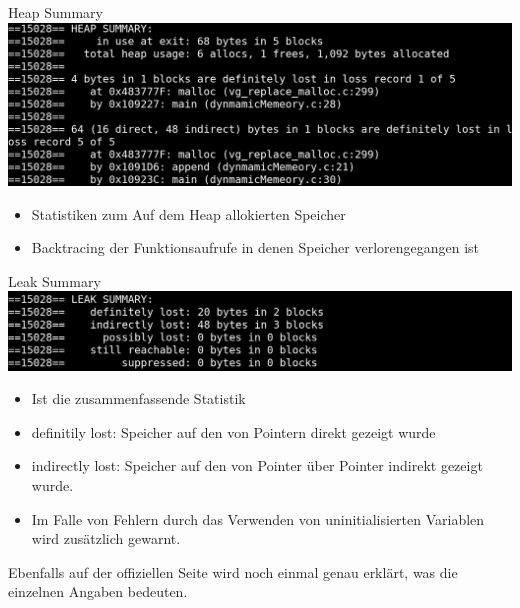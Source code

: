 \begin{frame}[fragile]{Heap Summary}
\includegraphics[width = \linewidth]{../img/heapSummary.png}
\begin{itemize}
 \item Statistiken zum Auf dem Heap allokierten Speicher
 \item Backtracing der Funktionsaufrufe in denen Speicher verlorengegangen ist
\end{itemize}

\end{frame}
\begin{frame}[fragile]{Leak Summary}
\includegraphics[width = \linewidth]{../img/leakSummary.png}
\begin{itemize}
 \item Ist die zusammenfassende Statistik
 \item definitily lost: Speicher auf den von Pointern direkt gezeigt wurde
 \item indirectly lost: Speicher auf den von Pointer über Pointer indirekt gezeigt wurde.
 \item Im Falle von Fehlern durch das Verwenden von uninitialisierten Variablen wird zusätzlich gewarnt. 
\end{itemize}
Ebenfalls auf der offiziellen Seite wird noch einmal genau erklärt, was die einzelnen Angaben bedeuten.
\end{frame}
